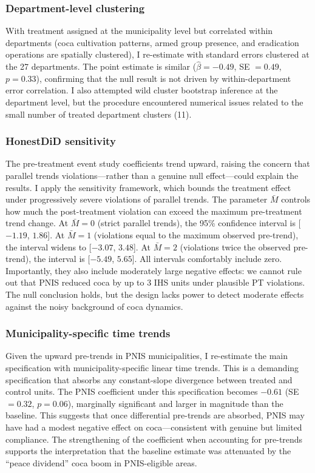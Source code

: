 \documentclass[12pt]{article}
\begin{document}
\subsubsection*{Department-level clustering} With treatment assigned at the municipality level but correlated within departments (coca cultivation patterns, armed group presence, and eradication operations are spatially clustered), I re-estimate with standard errors clustered at the 27 departments. The point estimate is similar ($\hat{\beta} = -0.49$, SE $= 0.49$, $p = 0.33$), confirming that the null result is not driven by within-department error correlation. I also attempted wild cluster bootstrap inference at the department level, but the procedure encountered numerical issues related to the small number of treated department clusters (11).

\subsubsection*{HonestDiD sensitivity} The pre-treatment event study coefficients trend upward, raising the concern that parallel trends violations---rather than a genuine null effect---could explain the results. I apply the \citet{rambachan2023} sensitivity framework, which bounds the treatment effect under progressively severe violations of parallel trends. The parameter $\bar{M}$ controls how much the post-treatment violation can exceed the maximum pre-treatment trend change. At $\bar{M} = 0$ (strict parallel trends), the 95\% confidence interval is [$-1.19$, $1.86$]. At $\bar{M} = 1$ (violations equal to the maximum observed pre-trend), the interval widens to [$-3.07$, $3.48$]. At $\bar{M} = 2$ (violations twice the observed pre-trend), the interval is [$-5.49$, $5.65$]. All intervals comfortably include zero. Importantly, they also include moderately large negative effects: we cannot rule out that PNIS reduced coca by up to 3 IHS units under plausible PT violations. The null conclusion holds, but the design lacks power to detect moderate effects against the noisy background of coca dynamics.

\subsubsection*{Municipality-specific time trends} Given the upward pre-trends in PNIS municipalities, I re-estimate the main specification with municipality-specific linear time trends. This is a demanding specification that absorbs any constant-slope divergence between treated and control units. The PNIS coefficient under this specification becomes $-0.61$ (SE $= 0.32$, $p = 0.06$), marginally significant and larger in magnitude than the baseline. This suggests that once differential pre-trends are absorbed, PNIS may have had a modest negative effect on coca---consistent with genuine but limited compliance. The strengthening of the coefficient when accounting for pre-trends supports the interpretation that the baseline estimate was attenuated by the ``peace dividend'' coca boom in PNIS-eligible areas.
\end{document}
